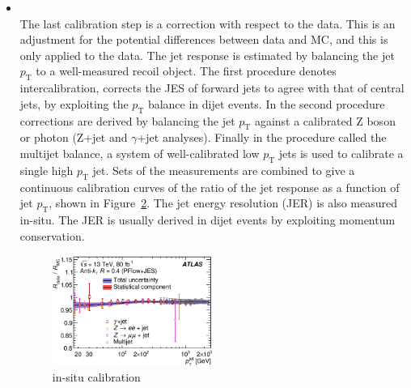 \begin{itemize}
\begin{figure}[tbp]
\begin{center}
    \caption{
      \cite{JETM-2018-05}
    }
    \label{fig:GSC}
    \end{center}
    \end{figure}
    \item \textbf{} \\
    The last calibration step is a correction with respect to the data. 
    This is an adjustment for the potential differences between data and MC, and this is only applied to the data.
    The jet response is estimated by balancing the jet $p_\mathrm{T}$ to a well-measured recoil object. 
    The first procedure denotes intercalibration, corrects the JES of forward jets to agree with that of central jets, by exploiting the $p_\mathrm{T}$ balance in dijet events. 
    In the second procedure corrections are derived by balancing the jet $p_\mathrm{T}$ against a calibrated Z boson or photon (Z+jet and $\gamma$+jet analyses). 
    Finally in the procedure called the multijet balance, a system of well-calibrated low $p_\mathrm{T}$ jets is used to calibrate a single high $p_\mathrm{T}$ jet. %
    Sets of the measurements are combined to give a continuous calibration curves of the ratio of the jet response as a function of jet $p_\mathrm{T}$, shown in Figure~\ref{fig:in-situcalibration}.
    The jet energy resolution (JER) is also measured in-situ. 
    The JER is usually derived in dijet events by exploiting momentum conservation.
    \begin{figure}[tbp]
    \begin{center}
    \includegraphics[width=0.5\textwidth,keepaspectratio]{figures/Reconstruction/insitucalibration}
    \caption{
    in-situ calibration \cite{JETM-2018-05}
    }
    \label{fig:in-situcalibration}
    \end{center}
    \end{figure}
\end{itemize}

